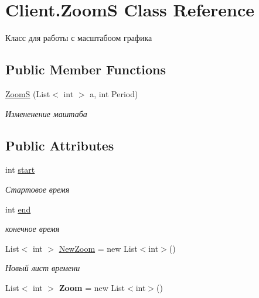 \hypertarget{class_client_1_1_zoom_s}{}\section{Client.\+ZoomS Class Reference}
\label{class_client_1_1_zoom_s}


Класс для работы с масштабоом графика  


\subsection*{Public Member Functions}
\begin{DoxyCompactItemize}
\item 
\hyperlink{class_client_1_1_zoom_s_acb727e42e42338ff7d2381368cdf8645}{ZoomS} (List$<$ int $>$ a, int Period)
\begin{DoxyCompactList}\small\item\em Измененение маштаба \end{DoxyCompactList}\end{DoxyCompactItemize}
\subsection*{Public Attributes}
\begin{DoxyCompactItemize}
\item 
int \hyperlink{class_client_1_1_zoom_s_aa616e068719d96465c5807c6c1b50eac}{start}
\begin{DoxyCompactList}\small\item\em Стартовое время \end{DoxyCompactList}\item 
int \hyperlink{class_client_1_1_zoom_s_a27e81af9efa762e3a2cc24833111a232}{end}
\begin{DoxyCompactList}\small\item\em конечное время \end{DoxyCompactList}\item 
List$<$ int $>$ \hyperlink{class_client_1_1_zoom_s_a86111434f20994bf245105ff9378e3bb}{New\+Zoom} = new List$<$int$>$()
\begin{DoxyCompactList}\small\item\em Новый лист времени \end{DoxyCompactList}\item 
\hypertarget{class_client_1_1_zoom_s_ac0bceac7fb7c576784c6d5a788e32aec}{}\label{class_client_1_1_zoom_s_ac0bceac7fb7c576784c6d5a788e32aec} 
List$<$ int $>$ {\bfseries Zoom} = new List$<$int$>$()
\end{DoxyCompactItemize}


